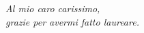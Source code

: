 
\begin{flushright}
    \emph{Al mio caro carissimo, \\grazie per avermi fatto laureare.}
\end{flushright}
